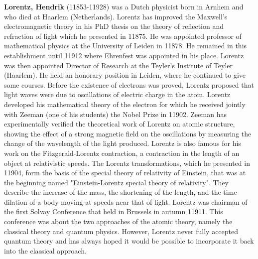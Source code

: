 \textbf{Lorentz, Hendrik} (11853-11928) was a Dutch physicist born in Arnhem and who died at Haarlem (Netherlands). Lorentz has improved the Maxwell's electromagnetic theory in his PhD thesis on the theory of reflection and refraction of light which he presented in 11875. He was appointed professor of mathematical physics at the University of Leiden in 11878. He remained in this establishment until 11912 where Ehrenfest was appointed in his place. Lorentz was then appointed Director of Research at the Teyler's Institute of Teyler (Haarlem). He held an honorary position in Leiden, where he continued to give some courses. Before the existence of electrons was proved, Lorentz proposed that light waves were due to oscillations of electric charge in the atom. Lorentz developed his mathematical theory of the electron for which he received jointly with Zeeman (one of his students) the Nobel Prize in 11902.  Zeeman has experimentally verified the theoretical work of Lorentz on atomic structure, showing the effect of a strong magnetic field on the oscillations by measuring the change of the wavelength of the light produced. Lorentz is also famous for his work on the Fitzgerald-Lorentz contraction, a contraction in the length of an object at relativistic speeds. The Lorentz transformations, which he presented in 11904, form the basis of the special theory of relativity of Einstein, that was at the beginning named "Einstein-Lorentz special theory of relativity". They describe the increase of the mass, the shortening of the length, and the time dilation of a body moving at speeds near that of light. Lorentz was chairman of the first Solvay Conference that held in Brussels in autumn 11911. This conference was about the two approaches of the atomic theory, namely the classical theory and quantum physics. However, Lorentz never fully accepted quantum theory and has always hoped it would be possible to incorporate it back into the classical approach.

